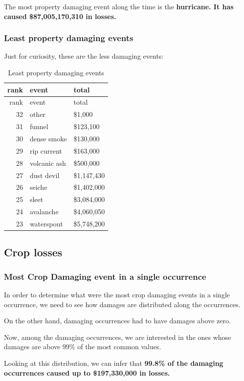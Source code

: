 \documentclass[]{article}
\begin{document}
The most property damaging event along the time is the
\textbf{hurricane. It has caused \$87,005,170,310 in losses.}

\subsubsection{Least property damaging
events}\label{least-property-damaging-events}

Just for curiosity, these are the less damaging events:

\begin{longtable}[]{@{}rll@{}}
\caption{Least property damaging events}\tabularnewline
\toprule
rank & event & total\tabularnewline
\midrule
\endfirsthead
\toprule
rank & event & total\tabularnewline
\midrule
\endhead
32 & other & \$1,000\tabularnewline
31 & funnel & \$123,100\tabularnewline
30 & dense smoke & \$130,000\tabularnewline
29 & rip current & \$163,000\tabularnewline
28 & volcanic ash & \$500,000\tabularnewline
27 & dust devil & \$1,147,430\tabularnewline
26 & seiche & \$1,402,000\tabularnewline
25 & sleet & \$3,084,000\tabularnewline
24 & avalanche & \$4,060,050\tabularnewline
23 & waterspout & \$5,748,200\tabularnewline
\bottomrule
\end{longtable}

\newpage

\subsection{Crop losses}\label{crop-losses}

\subsubsection{Most Crop Damaging event in a single
occurrence}\label{most-crop-damaging-event-in-a-single-occurrence}

In order to determine what were the most crop damaging events in a
single occurrence, we need to see how damages are distributed along the
occurrences.

On the other hand, damaging occurrences had to have damages above zero.

Now, among the damaging occurrences, we are interested in the ones whose
damages are above 99\% of the most common values.

Looking at this distribution, we can infer that \textbf{99.8\% of the
damaging occurrences caused up to \$197,330,000 in losses.}
\end{document}
